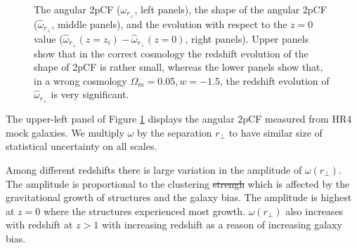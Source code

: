 \documentclass[iop]{emulateapj}
\providecommand{\DIFadd}[1]{{\protect\color{blue}\uwave{#1}}} %
\providecommand{\DIFdel}[1]{{\protect\color{red}\sout{#1}}}                      %
\providecommand{\DIFaddbegin}{} %
\providecommand{\DIFaddend}{} %
\providecommand{\DIFdelbegin}{} %
\providecommand{\DIFdelend}{} %
\begin{document}
\begin{figure}
   \caption{\label{fig_diffz}
  The angular 2pCF ($\omega_{r_\perp}$, left panels), the shape of the angular 2pCF ($\hat{\omega}_{r_\perp}$, middle panels),
  and the evolution with respect to the $z=0$ value ($\hat{\omega}_{r_{\perp}}(z=z_i) - \hat{\omega}_{r_{\perp}}(z=0)$, right panels). 
  Upper panels show that in the correct cosmology the redshift evolution of the shape of 2pCF is rather small, 
  whereas the lower panels show that, in a wrong cosmology $\Omega_m = 0.05,w=-1.5$, the redshift evolution of $\hat{\omega}_{r_\perp}$ is very significant.
   }
\end{figure}

The upper-left panel of Figure \ref{fig_diffz} displays the angular 2pCF measured from HR4 mock galaxies. %
We multiply $\omega$ by the separation $r_\perp$ to have similar size of statistical uncertainty on all scales.

Among different redshifts there is large variation in the amplitude of $\omega(r_\perp)$.
The amplitude is proportional to the clustering \DIFdelbegin \DIFdel{strengh }\DIFdelend \DIFaddbegin \DIFadd{strength, }\DIFaddend which is affected by the gravitational growth of structures and the galaxy bias.
The amplitude is highest at $z=0$ where the structures experienced \DIFaddbegin \DIFadd{the }\DIFaddend most growth.
$\omega(r_\perp)$ also increases with redshift at $z>1$ with increasing redshift 
as a reason of increasing galaxy bias.
\end{document}
